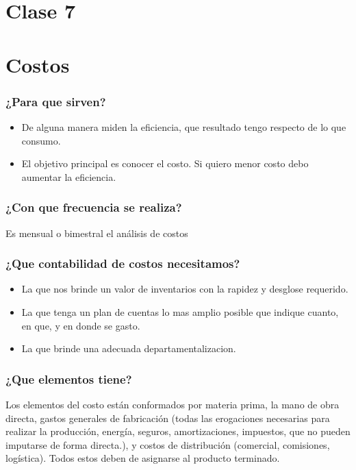 \documentclass[titlepage,a4paper]{article}
\begin{document}
\newpage
\section*{Clase 7}
\section{Costos}

\subsubsection*{¿Para que sirven?}
\begin{itemize}
\item De alguna manera miden la eficiencia, que resultado tengo respecto de lo que consumo.
\item El objetivo principal es conocer el costo. Si quiero menor costo debo aumentar la eficiencia.
\end{itemize}


\subsubsection*{¿Con que frecuencia se realiza?}
Es mensual o bimestral el análisis de costos

\subsubsection*{¿Que contabilidad de costos necesitamos?}
\begin{itemize}
\item La que nos brinde un valor de inventarios con la rapidez y desglose requerido.
\item La que tenga un plan de cuentas lo mas amplio posible que indique cuanto, en que, y en donde se gasto.
\item La que brinde una adecuada departamentalizacion.
\end{itemize}


\subsubsection*{¿Que elementos tiene?}
Los elementos del costo están conformados por materia prima, la mano de obra directa, gastos generales de fabricación (todas las erogaciones necesarias para realizar la producción, energía, seguros, amortizaciones, impuestos, que no pueden imputarse de forma directa.), y costos de distribución (comercial, comisiones, logística). Todos estos deben de asignarse al producto terminado.
\end{document}
